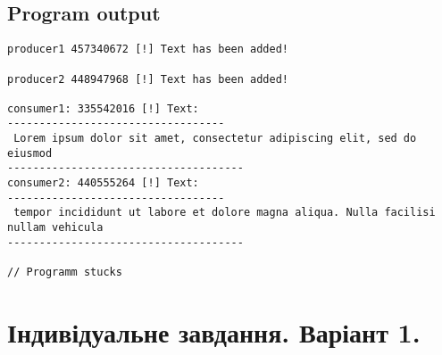 \documentclass{article}
\begin{document}
\subsection{Program output}
\begin{lstlisting}[]
producer1 457340672 [!] Text has been added! 

producer2 448947968 [!] Text has been added! 

consumer1: 335542016 [!] Text: 
----------------------------------
 Lorem ipsum dolor sit amet, consectetur adipiscing elit, sed do eiusmod 
-------------------------------------
consumer2: 440555264 [!] Text: 
----------------------------------
 tempor incididunt ut labore et dolore magna aliqua. Nulla facilisi nullam vehicula 
-------------------------------------

// Programm stucks

\end{lstlisting}


\section{Індивідуальне завдання. Варіант 1.}
\end{document}
